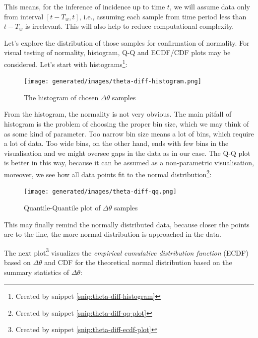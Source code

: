 \documentclass[
  digital, %
  oneside, %
  lof,     %
  lot,     %
]{fithesis4}
\begin{document}
This means, for the inference of incidence up to time $t$, 
we will assume data only from interval $[t - T_w, t]$, i.e.,
assuming each sample from time period less than
$t - T_w$ is irrelevant.
This will also help to reduce computational complexity.

Let's explore the distribution of those samples 
for confirmation of normality. 
For visual testing of normality, histogram, 
Q-Q and ECDF/CDF plots may be considered. 
Let's start with histograms\footnote{Created by snippet \ref{snip:theta-diff-histogram}}:

\begin{figure}[H]
  \begin{center}
    \texttt{[image: generated/images/theta-diff-histogram.png]}
  \end{center}
  \caption{The histogram of chosen $\Delta \theta$ samples}
  \label{fig:theta-diff-histogram}
\end{figure}

From the histogram, the normality is not 
very obvious. 
The main pitfall of histogram is the problem 
of choosing the proper bin size, which we may 
think of as some kind of parameter. 
Too narrow bin size means a lot of bins, which 
require a lot of data. 
Too wide bins, on the other hand, ends with 
few bins in the visualisation and we might 
oversee gaps in the data as in our case.
The Q-Q plot is better in this way, because 
it can be assumed as a non-parametric 
visualisation, moreover, we see how all data 
points fit to the normal distribution\footnote{Created by snippet \ref{snip:theta-diff-qq-plot}}:

\begin{figure}[H]
  \begin{center}
    \texttt{[image: generated/images/theta-diff-qq.png]}
  \end{center}
  \caption{Quantile-Quantile plot of $\Delta \theta$ samples}
  \label{fig:theta-diff-qq}
\end{figure}


This may finally remind the normally distributed 
data, because closer the points are to the line, 
the more normal distribution is approached in 
the data.

The next plot\footnote{Created by snippet \ref{snip:theta-diff-ecdf-plot}} visualizes the 
\textit{empirical cumulative distribution function}
(ECDF) based on $\Delta \theta$ and CDF for the 
theoretical normal distribution based on 
the summary statistics of $\Delta \theta$:
\end{document}
